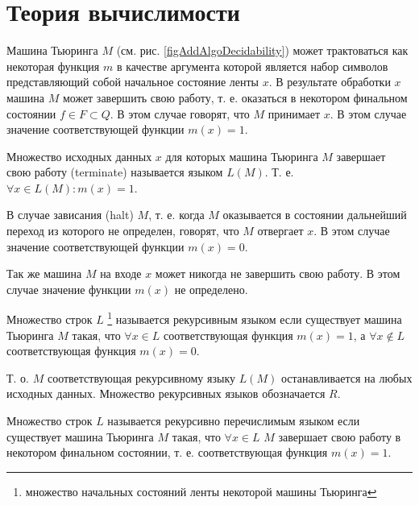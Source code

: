 \section{Теория вычислимости}

Машина Тьюринга $M$ (см. рис. \ref{figAddAlgoDecidability}) может
трактоваться как некоторая функция $m$ в качестве 
аргумента которой является набор символов представляющий собой
начальное состояние ленты $x$. В результате обработки $x$ машина $M$
может завершить свою работу, т. е. оказаться в некотором финальном
состоянии $f \in F \subset Q$. В этом случае говорят, что $M$
принимает $x$. В этом случае значение соответствующей функции 
$m(x) = 1$. 



\begin{definition}
Множество исходных данных $x$ для которых машина Тьюринга $M$ завершает
свою работу (terminate) называется языком $L\left(M\right)$. Т. е.  
$\forall x \in L\left(M\right): m(x) = 1$.
\end{definition}

В случае зависания (halt) $M$, т. е. когда $M$
оказывается в состоянии дальнейший переход из которого не определен,
говорят, что $M$ отвергает $x$. В этом случае значение соответствующей
функции $m(x) =0$. 

Так же машина $M$ на входе $x$ может никогда не
завершить свою работу. В этом случае значение функции $m(x)$
не определено.    

\begin{definition}
Множество строк $L$
\footnote{множество начальных состояний ленты некоторой
машины Тьюринга}
называется рекурсивным языком если существует машина Тьюринга $M$
такая, что $\forall x \in L$ соответствующая функция $m(x) = 1$, а 
$\forall x \notin L$ соответствующая функция $m(x) = 0$. 
\end{definition}

Т. о. $M$ соответствующая рекурсивному языку $L\left(M\right)$ 
останавливается на любых исходных данных. Множество рекурсивных языков
обозначается $R$.

\begin{definition}
Множество строк $L$
называется рекурсивно перечислимым языком если существует машина Тьюринга $M$
такая, что $\forall x \in L$ $M$ завершает свою работу в некотором
финальном состоянии, т. е. соответствующая функция $m(x) = 1$. 
\end{definition}

